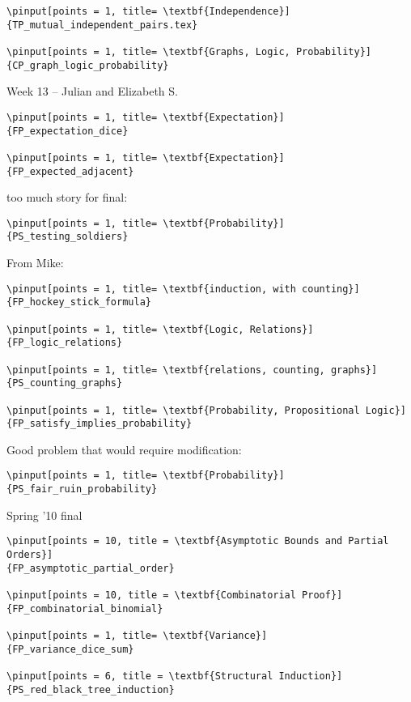 \documentclass[quiz]{mcs}
\begin{document}
\begin{staffnotes}
\begin{verbatim}
\pinput[points = 1, title= \textbf{Independence}]
{TP_mutual_independent_pairs.tex}

\pinput[points = 1, title= \textbf{Graphs, Logic, Probability}]
{CP_graph_logic_probability}

\end{verbatim}

\begin{center}
{\large Week 13 -- Julian and Elizabeth S.}
\end{center}

\begin{verbatim}
\pinput[points = 1, title= \textbf{Expectation}]
{FP_expectation_dice}

\pinput[points = 1, title= \textbf{Expectation}]
{FP_expected_adjacent}

\end{verbatim}

too much story for final:
\begin{verbatim}
\pinput[points = 1, title= \textbf{Probability}]
{PS_testing_soldiers}
\end{verbatim}

From Mike:

\begin{verbatim}
\pinput[points = 1, title= \textbf{induction, with counting}]
{FP_hockey_stick_formula}

\pinput[points = 1, title= \textbf{Logic, Relations}]
{FP_logic_relations}

\pinput[points = 1, title= \textbf{relations, counting, graphs}]
{PS_counting_graphs}

\pinput[points = 1, title= \textbf{Probability, Propositional Logic}]
{FP_satisfy_implies_probability}
\end{verbatim}

Good problem that would require modification:
\begin{verbatim}
\pinput[points = 1, title= \textbf{Probability}]
{PS_fair_ruin_probability}
\end{verbatim}

Spring '10 final

\begin{verbatim}
\pinput[points = 10, title = \textbf{Asymptotic Bounds and Partial Orders}]
{FP_asymptotic_partial_order}

\pinput[points = 10, title = \textbf{Combinatorial Proof}]
{FP_combinatorial_binomial}

\pinput[points = 1, title= \textbf{Variance}]
{FP_variance_dice_sum}

\pinput[points = 6, title = \textbf{Structural Induction}]
{PS_red_black_tree_induction}
\end{verbatim}

\end{staffnotes}
\end{document}
